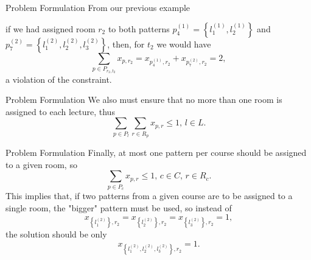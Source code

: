 \documentclass{beamer}
\begin{document}
\begin{frame}{Problem Formulation}
    From our previous example
    \begin{table}[H]
        \centering
    \end{table}
    if we had assigned room $r_2$ to both patterns $p_4^{(1)}=\left\{  l_1^{(1)}, l_2^{(1)}\right\} $ and $p_7^{(2)}=\left\{ l_1^{(2)}, l_2^{(2)}, l_3^{(2)} \right\} $, then, for $t_2$ we would have \[
    \sum_{p \in P_{r_2,t_2}} x_{p,r_2} = x_{p_4^{(1)}, r_2} + x_{p_7^{(2)},r_2} = 2
    ,\] a violation of the constraint.
\end{frame}

\begin{frame}{Problem Formulation}
    We also must ensure that no more than one room is assigned to each lecture, thus \[
	\sum_{p \in P_l} \sum_{r \in R_p} x_{p,r} \le 1,\, l \in L
    .\] 
\end{frame}

\begin{frame}{Problem Formulation}
    Finally, at most one pattern per course should be assigned to a given room, so \[
	\sum_{p \in P_c} x_{p,r} \le 1,\, c \in C,\, r \in R_c
    .\] This implies that, if two patterns from a given course are to be assigned to a single room, the "bigger" pattern must be used, so instead of \[
    x_{\left\{ l_1^{(2)}\right\} ,r_2 } = x_{\left\{ l_2^{(2)}\right\} ,r_2 } = x_{\left\{ l_3^{(2)}\right\} ,r_2 } = 1
    ,\] the solution should be only \[
    x_{\left\{ l_1^{(2)}, l_2^{(2)}, l_3^{(2)}\right\} ,r_2 } = 1
    .\] 
\end{frame}
\end{document}

